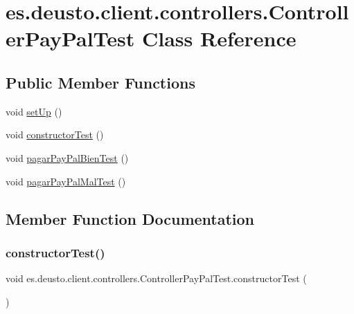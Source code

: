 \hypertarget{classes_1_1deusto_1_1client_1_1controllers_1_1_controller_pay_pal_test}{}\section{es.\+deusto.\+client.\+controllers.\+Controller\+Pay\+Pal\+Test Class Reference}
\label{classes_1_1deusto_1_1client_1_1controllers_1_1_controller_pay_pal_test}
\subsection*{Public Member Functions}
\begin{DoxyCompactItemize}
\item 
void \mbox{\hyperlink{classes_1_1deusto_1_1client_1_1controllers_1_1_controller_pay_pal_test_a05771e0349554f5b4cd8e851f3714fdb}{set\+Up}} ()
\item 
void \mbox{\hyperlink{classes_1_1deusto_1_1client_1_1controllers_1_1_controller_pay_pal_test_acdfe680bea6825f752c672833d540631}{constructor\+Test}} ()
\item 
void \mbox{\hyperlink{classes_1_1deusto_1_1client_1_1controllers_1_1_controller_pay_pal_test_a4386ccfd6439c0ff3a95c7a1f5b4f1d1}{pagar\+Pay\+Pal\+Bien\+Test}} ()
\item 
void \mbox{\hyperlink{classes_1_1deusto_1_1client_1_1controllers_1_1_controller_pay_pal_test_a5b3e2420723245c04bc8e78fa201707b}{pagar\+Pay\+Pal\+Mal\+Test}} ()
\end{DoxyCompactItemize}


\subsection{Member Function Documentation}
\mbox{\label{classes_1_1deusto_1_1client_1_1controllers_1_1_controller_pay_pal_test_acdfe680bea6825f752c672833d540631}} 
\subsubsection{\texorpdfstring{constructorTest()}{constructorTest()}}
{\footnotesize\ttfamily void es.\+deusto.\+client.\+controllers.\+Controller\+Pay\+Pal\+Test.\+constructor\+Test (\begin{DoxyParamCaption}{ }\end{DoxyParamCaption})}

